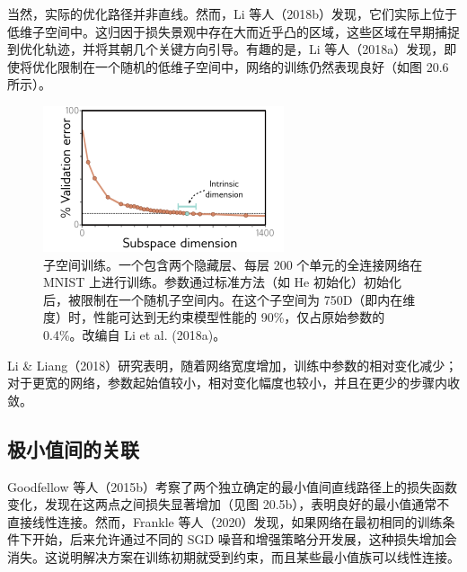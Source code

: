 当然，实际的优化路径并非直线。然而，Li 等人（2018b）发现，它们实际上位于低维子空间中。这归因于损失景观中存在大而近乎凸的区域，这些区域在早期捕捉到优化轨迹，并将其朝几个关键方向引导。有趣的是，Li 等人（2018a）发现，即使将优化限制在一个随机的低维子空间中，网络的训练仍然表现良好（如图 20.6 所示）。

\begin{figure}[ht!]
\centering
\includegraphics[width=0.7\linewidth]{png/chapter20/WhySubspace.png}
\caption{子空间训练。一个包含两个隐藏层、每层 200 个单元的全连接网络在 MNIST 上进行训练。参数通过标准方法（如 He 初始化）初始化后，被限制在一个随机子空间内。在这个子空间为 750D（即内在维度）时，性能可达到无约束模型性能的 90\%，仅占原始参数的 0.4\%。改编自 Li et al. (2018a)。}
\end{figure}

Li \& Liang（2018）研究表明，随着网络宽度增加，训练中参数的相对变化减少；对于更宽的网络，参数起始值较小，相对变化幅度也较小，并且在更少的步骤内收敛。

\subsection{极小值间的关联}
Goodfellow 等人（2015b）考察了两个独立确定的最小值间直线路径上的损失函数变化，发现在这两点之间损失显著增加（见图 20.5b），表明良好的最小值通常不直接线性连接。然而，Frankle 等人（2020）发现，如果网络在最初相同的训练条件下开始，后来允许通过不同的 SGD 噪音和增强策略分开发展，这种损失增加会消失。这说明解决方案在训练初期就受到约束，而且某些最小值族可以线性连接。

